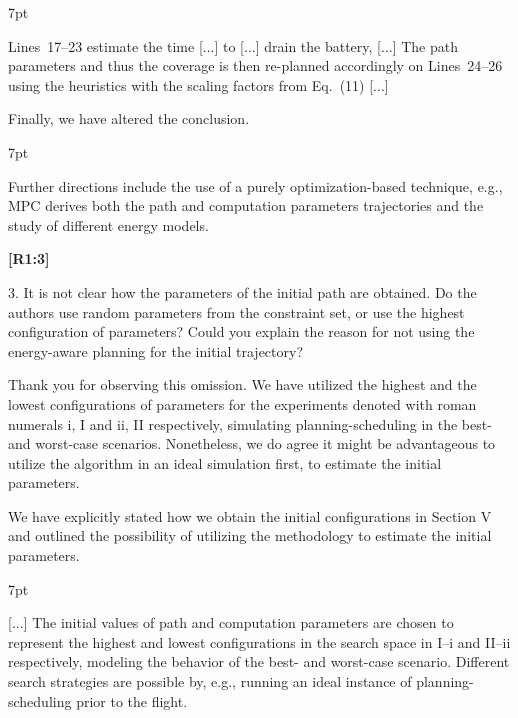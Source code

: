 \documentclass[10pt]{letter}
\newenvironment{formal}{%
  \def\FrameCommand{%
    \hspace{1pt}%
    {\color{red}\vrule width 2pt}%
    {\color{formalshade}\vrule width 4pt}%
    \colorbox{formalshade}%
  }%
  \MakeFramed{\advance\hsize-\width\FrameRestore}%
  \noindent\hspace{-4.55pt}%
  \begin{adjustwidth}{}{7pt}%
  \vspace{2pt}\vspace{2pt}%
}
{%
  \vspace{2pt}\end{adjustwidth}\endMakeFramed%
}
\begin{document}
{\begin{formal}
  Lines~{\color{red}17}--{\color{red}23} estimate the time [...] to [...] drain the battery, [...] The {\color{blue}path parameters and thus the} coverage is then re{\color{blue}-}planned accordingly on Lines~{\color{red}24}--{\color{red}26} using {\color{blue} the heuristics with the} %
  scaling factors from Eq.~({\color{red}11}) [...]

  \vspace*{1ex}
  \end{formal}

  Finally, we have altered the conclusion.

  \begin{formal}
  \color{black}
  Further directions include {\color{blue}the use of a purely optimization-based technique, e.g., MPC derives both the path and computation parameters trajectories and} the study of different energy models.
  \vspace*{1ex}
  \end{formal}
}

{\hspace*{-4.5em}\textbf{[R1:3]}\vspace*{-1.9em}}

3. It is not clear how the parameters of the initial path are obtained. Do the authors use random parameters from the constraint set, or use the highest configuration of parameters? Could you explain the reason for not using the energy-aware planning for the initial trajectory?

{\color{blue}

{\hspace*{-4.5em}{[R1:3]}\vspace*{-1.9em}}

Thank you for observing this omission. We have utilized the highest and the lowest configurations of parameters for the experiments denoted with roman numerals i, I and ii, II respectively, simulating planning-scheduling in the best- and worst-case scenarios. Nonetheless, we do agree it might be advantageous to utilize the algorithm in an ideal simulation first, to estimate the initial parameters.

We have explicitly stated how we obtain the initial configurations in Section V and outlined the possibility of utilizing the methodology to estimate the initial parameters.

\begin{formal}
  \color{black} [...] {\color{blue} The initial values of path and computation parameters are chosen to represent the highest and lowest configurations in the search space in {\color{red}I}--{\color{red}i} and {\color{red}II}--{\color{red}ii} respectively, modeling the behavior of the best- and worst-case scenario. Different search strategies are possible by, e.g., running an ideal instance of planning-scheduling prior to the flight.}
  \vspace*{1ex}
\end{formal}

}
\end{document}
